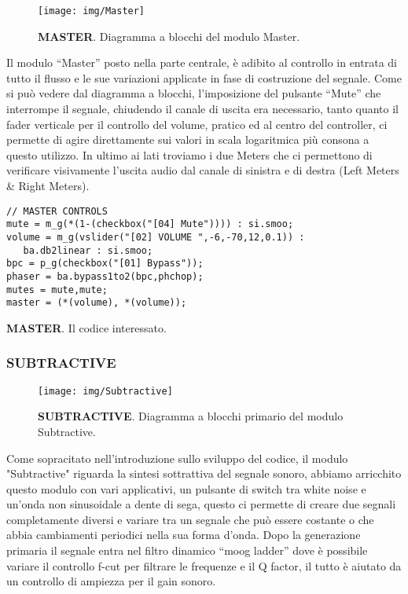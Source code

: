 \documentclass[
	a4paper,
	twocolumn
	]{article}
\begin{document}
\begin{figure}[h]
\begin{center}
\texttt{[image: img/Master]}
\caption{\textbf{MASTER}. Diagramma a blocchi del modulo Master.}
\label{gr01}
\end{center}
\end{figure}

Il modulo “Master” posto nella parte centrale, è adibito al controllo in entrata di tutto il flusso e le sue variazioni applicate in fase di costruzione del segnale. Come si può vedere dal diagramma a blocchi, l’imposizione del pulsante “Mute” che interrompe il segnale, chiudendo il canale di uscita era necessario, tanto quanto il fader verticale per il controllo del volume, pratico ed al centro del controller, ci permette di agire direttamente sui valori in scala logaritmica più consona a questo utilizzo. In ultimo ai lati troviamo i due Meters che ci permettono di verificare visivamente  l’uscita audio dal canale di sinistra e di destra (Left Meters & Right Meters).


\begin{lstlisting}
// MASTER CONTROLS
mute = m_g(*(1-(checkbox("[04] Mute")))) : si.smoo;
volume = m_g(vslider("[02] VOLUME ",-6,-70,12,0.1)) :
   ba.db2linear : si.smoo;
bpc = p_g(checkbox("[01] Bypass"));
phaser = ba.bypass1to2(bpc,phchop);
mutes = mute,mute;
master = (*(volume), *(volume));
\end{lstlisting}

\caption{\textbf{MASTER}. Il codice interessato.}

\subsubsection*{SUBTRACTIVE}

\begin{figure}[h]
\begin{center}
\texttt{[image: img/Subtractive]}
\caption{\textbf{SUBTRACTIVE}. Diagramma a blocchi primario del modulo Subtractive.}
\label{gr01}
\end{center}
\end{figure}

Come sopracitato nell’introduzione sullo sviluppo del codice, il modulo "Subtractive" riguarda la sintesi sottrattiva del segnale sonoro, abbiamo arricchito questo modulo con vari applicativi, un pulsante di switch tra white noise e un’onda non sinusoidale a dente di sega, questo ci permette di creare due segnali completamente diversi e variare tra un segnale che può essere costante o che abbia cambiamenti periodici nella sua forma d’onda. Dopo la generazione primaria il segnale entra nel filtro dinamico “moog ladder” dove è possibile variare il controllo f-cut  per filtrare le frequenze e il Q factor, il tutto è aiutato da un controllo di ampiezza per il gain sonoro.
\end{document}

